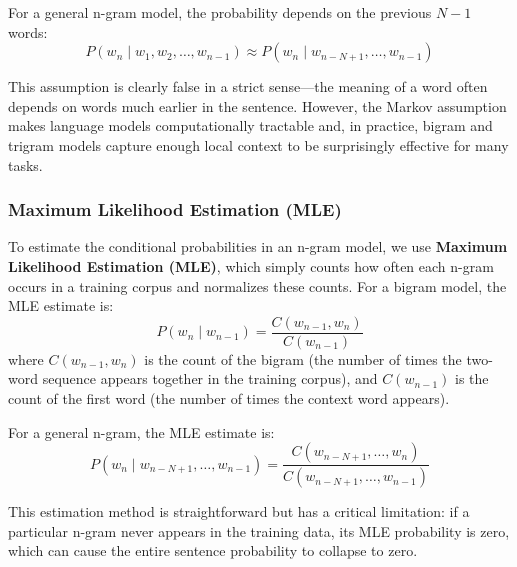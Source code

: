 \documentclass[11pt,a4paper]{article}
\begin{document}
For a general n-gram model, the probability depends on the previous $N-1$ words:
\[
P(w_n \mid w_1, w_2, \ldots, w_{n-1}) \approx P(w_n \mid w_{n-N+1}, \ldots, w_{n-1})
\]

This assumption is clearly false in a strict sense---the meaning of a word often depends on words much earlier in the sentence. However, the Markov assumption makes language models computationally tractable and, in practice, bigram and trigram models capture enough local context to be surprisingly effective for many tasks.

\subsubsection{Maximum Likelihood Estimation (MLE)}

To estimate the conditional probabilities in an n-gram model, we use \textbf{Maximum Likelihood Estimation (MLE)}, which simply counts how often each n-gram occurs in a training corpus and normalizes these counts. For a bigram model, the MLE estimate is:
\[
P(w_n \mid w_{n-1}) = \frac{C(w_{n-1}, w_n)}{C(w_{n-1})}
\]
where $C(w_{n-1}, w_n)$ is the count of the bigram (the number of times the two-word sequence appears together in the training corpus), and $C(w_{n-1})$ is the count of the first word (the number of times the context word appears).

For a general n-gram, the MLE estimate is:
\[
P(w_n \mid w_{n-N+1}, \ldots, w_{n-1}) = \frac{C(w_{n-N+1}, \ldots, w_n)}{C(w_{n-N+1}, \ldots, w_{n-1})}
\]

This estimation method is straightforward but has a critical limitation: if a particular n-gram never appears in the training data, its MLE probability is zero, which can cause the entire sentence probability to collapse to zero.
\end{document}
